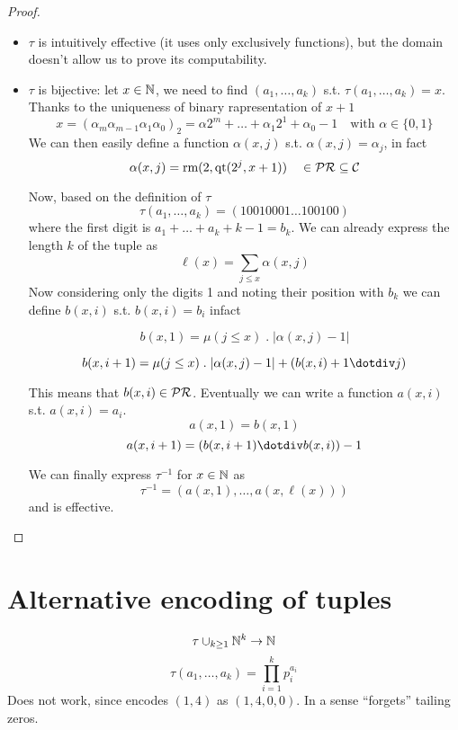 \begin{lemma}
\begin{proof}
\begin{enumerate}[label=(\arabic*)]
{        \begin{itemize}
        \item $\tau$ is intuitively effective (it uses only
          exclusively functions), but the domain doesn't allow us to
          prove its computability.
        \item $\tau$ is bijective: let $x \in \mathbb{N}$, we need to find
          $(a_1, \dots, a_k)$ s.t. $\tau(a_1,\dots,a_k) = x$. Thanks
          to the uniqueness of binary rapresentation of $x+1$
          \[x = (\alpha_m \alpha_{m-1} \alpha_1 \alpha_0)_2 = \alpha
            2^m + \dots + \alpha_1 2^1 + \alpha_0 - 1 \quad \text{with
            } \alpha \in \{0,1\} \] We can then easily define a
          function $\alpha(x,j)$ s.t. $\alpha(x,j) = \alpha_j$, in
          fact
          \[\alpha(x, j) = \text{rm}(2, \text{qt}(2^j, x+1)) \quad \in
            \mathcal{PR} \subseteq \mathcal{C}\]

          Now, based on the definition of $\tau$
          \[\tau(a_1, \dots, a_k) = (1 0 0 1 0 0 0 1 \dots 1 0 0 1 0
            0)\] where the first digit is $a_1+\dots+a_k+k-1 =
          b_k$. We can already express the length $k$ of the tuple
          as \[\ell (x) = \sum_{j \leq x}\alpha(x,j)\] Now considering
          only the digits 1 and noting their position with $b_k$ we
          can define $b(x,i)$ s.t. $b(x,i) = b_i$ infact
          
          \[b(x,1) = \mu(j \leq x) \; . \; |\alpha(x,j) - 1|\]
          
          \[b(x,i+1) = \mu(j \leq x) \; . \; |\alpha(x,j)-1| +
            (b(x,i)+1 \dotdiv j)\]

          This means that $b(x,i)\in \mathcal{PR}$.  Eventually we can write a
          function $a(x,i)$ s.t. $a(x,i) = a_i$.
          \[a(x,1) = b(x,1)\]
          \[a(x,i+1) = (b(x,i+1) \dotdiv b(x,i))-1\]

          We can finally express $\tau^{-1}$ for $x \in \mathbb{N}$ as
          \[\tau^{-1} = (a(x,1), \dots, a(x, \ell(x)))\] and is
          effective.
        \end{itemize}
      }
    \end{enumerate}
  \end{proof}
\end{lemma}

\section{Alternative encoding of tuples}
$$\tau \cup_{k \geq 1} \mathbb{N}^k \rightarrow \mathbb{N}$$
$$\tau(a_1, \dots, a_k) = \prod_{i=1}^{k}p_i^{a_i}$$
Does not work, since encodes $(1,4)$ as $(1,4,0,0)$. In a sense
``forgets'' tailing zeros.

